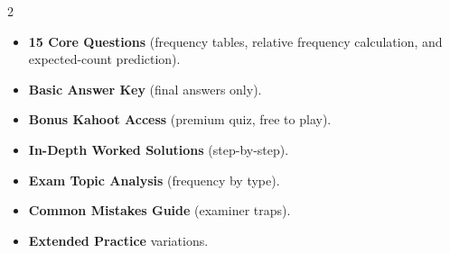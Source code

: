 \documentclass[11pt,a4paper]{article}
\newcommand{\FullReleaseDate}{April 30, 2026}
\begin{document}
\vspace{8pt}

\begin{multicols}{2}
  \begin{tcolorbox}[card, title=\sffamily\bfseries\textcolor{white}{\faHandPointDown\ TODAY (Simplified Version)}, colbacktitle=mainblue, boxed title style={sharp corners, boxrule=0pt}]
    \begin{itemize}[leftmargin=1.2em, itemsep=2pt]
      \item \small \textbf{15 Core Questions} (frequency tables, relative frequency calculation, and expected-count prediction).
      \item \small \textbf{Basic Answer Key} (final answers only).
      \item \small \textbf{Bonus Kahoot Access} (premium quiz, free to play).
    \end{itemize}
  \end{tcolorbox}

  \columnbreak

  \begin{tcolorbox}[card, title=\sffamily\bfseries\textcolor{white}{\faRocket\ ON \FullReleaseDate\ (Full Upgrade)}, colbacktitle=mainblue, boxed title style={sharp corners, boxrule=0pt}]
    \begin{itemize}[leftmargin=1.2em, itemsep=2pt]
      \item \small \textbf{In-Depth Worked Solutions} (step-by-step).
      \item \small \textbf{Exam Topic Analysis} (frequency by type).
      \item \small \textbf{Common Mistakes Guide} (examiner traps).
      \item \small \textbf{Extended Practice} variations.
    \end{itemize}
  \end{tcolorbox}
\end{multicols}
\end{document}
